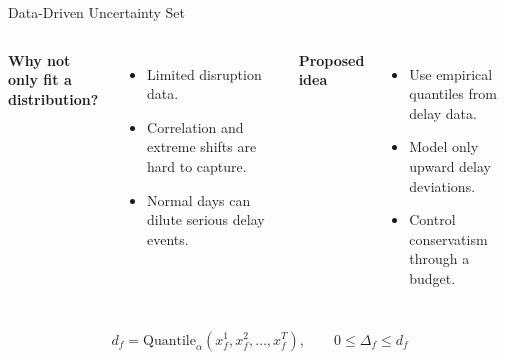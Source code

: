\documentclass[aspectratio=169]{beamer}
\begin{document}
\begin{frame}{Data-Driven Uncertainty Set}
  \begin{columns}[T,onlytextwidth]
      \textbf{Why not only fit a distribution?}
      \begin{itemize}
        \item Limited disruption data.
        \item Correlation and extreme shifts are hard to capture.
        \item Normal days can dilute serious delay events.
      \end{itemize}

      \textbf{Proposed idea}
      \begin{itemize}
        \item Use empirical quantiles from delay data.
        \item Model only upward delay deviations.
        \item Control conservatism through a budget.
      \end{itemize}
  \end{columns}

  \vspace{0.35cm}
  \[
    d_f = \mathrm{Quantile}_{\alpha}
    \left(x_f^1, x_f^2, \ldots, x_f^T\right),
    \qquad
    0 \leq \Delta_f \leq d_f
  \]
\end{frame}
\end{document}
